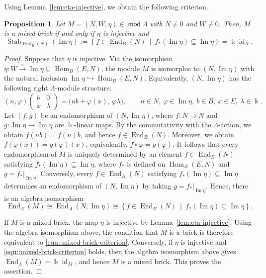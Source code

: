 \documentclass[a4,12pt]{amsart}
\numberwithin{equation}{section} %
\def\Hom{\operatorname{Hom}} %
\def\End{\operatorname{End}} %
\def\Im{\operatorname{Im}} %
\def\Stab{\operatorname{Stab}} %
\def\mod{\operatorname{\mathsf{mod}}}
\newtheorem{proposition}[theorem]{Proposition} %
\theoremstyle{definition} %
\begin{document}
Using Lemma~\ref{lem:eta-injective}, we obtain the following criterion. 
\begin{proposition}\label{prop::mixed-brick-criterion}
Let $M=(N,W,\eta)\in\mod \Lambda$ with $N\neq 0$ and $W\neq 0$. Then, $M$ is a mixed brick if and only if $\eta$ is injective and
\begin{equation}\label{equ::mixed-brick-criterion}
\Stab_{\End_B(N)}(\Im\eta):=\left\{
f\in\End_B(N)\ \middle|\ f_*(\Im\eta)\subseteq \Im\eta
\right\}
=
\Bbbk\operatorname{id}_{N} .
\end{equation}
\end{proposition}
\begin{proof}
Suppose that $\eta$ is injective. Via the isomorphism $\eta\colon W\xrightarrow{\sim}\Im\eta\subseteq \Hom_B(E,N)$, the module $M$ is isomorphic to  $(N,\Im\eta)$ with the natural inclusion $\Im\eta\hookrightarrow \Hom_B(E,N)$. Equivalently, $(N,\Im\eta)$ has the following right $\Lambda$-module structure:
\[
(n,\varphi)
\begin{pmatrix}
b&0\\
x&\lambda
\end{pmatrix}
=
\bigl(nb+\varphi(x),\,\varphi \lambda\bigr),
\qquad
n\in N,\ \varphi\in \Im\eta,\ b\in B,\ x\in E,\ \lambda\in\Bbbk .
\]
Let $(f,g)$ be an endomorphism of $(N,\Im\eta)$, where $f\colon N\to N$ and $g\colon \Im\eta\to \Im\eta$ are $\Bbbk$-linear maps. By the commutativity with the $\Lambda$-action, we obtain $f(nb)=f(n)b$, and hence $f\in\End_B(N)$. Moreover, we obtain $f(\varphi(x))=g(\varphi)(x)$, equivalently, $f\circ \varphi=g(\varphi)$. It follows that every endomorphism of $M$ is uniquely determined by an element $f\in\End_B(N)$ satisfying $f_*(\Im\eta)\subseteq\Im\eta$, where $f_*$ is defined on $\Hom_B(E,N)$ and $g=f_*|_{\Im\eta}$. Conversely, every $f\in\End_B(N)$ satisfying $f_*(\Im\eta)\subseteq\Im\eta$ determines an endomorphism of $(N,\Im\eta)$ by taking $g=f_*|_{\Im\eta}$. Hence, there is an algebra isomorphism
\[
\End_{\Lambda}(M)\cong \End_{\Lambda}(N,\Im\eta)
\cong
\left\{
f\in\End_B(N)\ \middle|\ f_*(\Im\eta)\subseteq \Im\eta
\right\}.
\] 

If $M$ is a mixed brick, the map $\eta$ is injective by Lemma~\ref{lem:eta-injective}. Using the algebra isomorphism above, the condition that $M$ is a brick is therefore equivalent to \eqref{equ::mixed-brick-criterion}. Conversely, if $\eta$ is injective and \eqref{equ::mixed-brick-criterion} holds, then the algebra isomorphism above gives $\End_{\Lambda}(M)=\Bbbk\operatorname{id}_M$, and hence $M$ is a mixed brick. This proves the assertion.
\end{proof}
\end{document}
